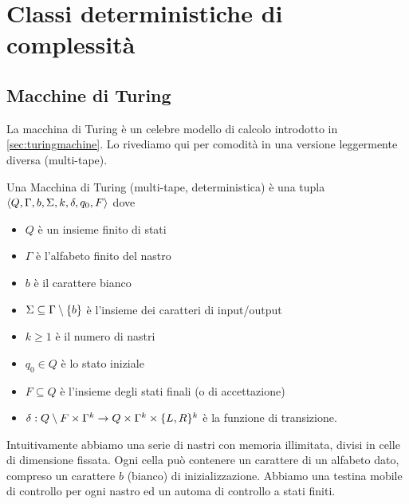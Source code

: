 %
%
%
%
\chapter{Classi deterministiche di complessità}

\section{Macchine di Turing}

La macchina di Turing è un celebre modello di calcolo introdotto in \ref{sec:turingmachine}. Lo
rivediamo qui per comodità in una versione leggermente diversa (multi-tape).

\begin{defn}
    Una Macchina di Turing (multi-tape, deterministica) è una tupla $\langle Q, \Gamma, b, \Sigma,
    k, \delta, q_{0}, F \rangle$ dove
    \begin{itemize}
        \item $Q$ è un insieme finito di stati
        \item $\Gamma$ è l'alfabeto finito del nastro
        \item $b$ è il carattere bianco
        \item $\Sigma \subseteq \Gamma \setminus \{b\}$ è l'insieme dei caratteri di input/output
        \item $k \geq 1$ è il numero di nastri
        \item $q_{0} \in Q$ è lo stato iniziale
        \item $F \subseteq Q$ è l'insieme degli stati finali (o di accettazione)
        \item $\delta: Q \setminus F \times \Gamma^{k} \to Q \times \Gamma^{k} \times
        \{L,R\}^{k}$ è la funzione di transizione.
    \end{itemize}
\end{defn}

Intuitivamente abbiamo una serie di nastri con memoria illimitata, divisi in celle di dimensione
fissata. Ogni cella può contenere un carattere di un alfabeto dato, compreso un carattere $b$
(bianco) di inizializzazione. Abbiamo una testina mobile di controllo per ogni nastro ed un automa
di controllo a stati finiti.

